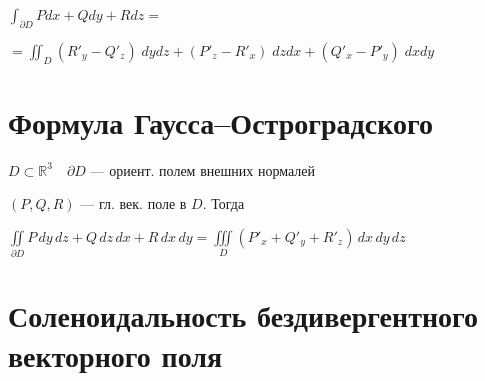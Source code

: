 \documentclass[paper=a4, fontsize=17pt]{article}
\begin{document}
$\displaystyle\int_{\partial D} P dx + Q dy + R dz =$

$= \displaystyle\iint_D (R'_y - Q'_z) \;dy dz + (P'_z - R'_x) \;dz dx + (Q'_x - P'_y) \;dx dy$

\section{Формула Гаусса--Остроградского}

$D \subset \mathbb R^3 \quad \partial D$ — ориент. полем внешних нормалей

$(P, Q, R)$ — гл. век. поле в $D$. Тогда


 $\displaystyle\iint\limits_{\partial D} P \,dy\,dz + Q \,dz\,dx + R \,dx\,dy = \iiint\limits_D (P'_x + Q'_y + R'_z)\,dx\,dy\,dz$

\section{Соленоидальность бездивергентного векторного поля}
\end{document}
